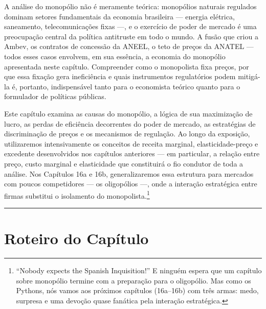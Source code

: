 \documentclass[11pt,twoside,openright]{book}
\begin{document}
A análise do monopólio não é meramente teórica: monopólios naturais
regulados dominam setores fundamentais da economia brasileira ---
energia elétrica, saneamento, telecomunicações fixas ---, e o exercício
de poder de mercado é uma preocupação central da política antitruste em
todo o mundo. A fusão que criou a Ambev, os contratos de concessão da
ANEEL, o teto de preços da ANATEL --- todos esses casos envolvem, em sua
essência, a economia do monopólio apresentada neste capítulo.
Compreender como o monopolista fixa preços, por que essa fixação gera
ineficiência e quais instrumentos regulatórios podem mitigá-la é,
portanto, indispensável tanto para o economista teórico quanto para o
formulador de políticas públicas.

Este capítulo examina as causas do monopólio, a lógica de sua
maximização de lucro, as perdas de eficiência decorrentes do poder de
mercado, as estratégias de discriminação de preços e os mecanismos de
regulação. Ao longo da exposição, utilizaremos intensivamente os
conceitos de receita marginal, elasticidade-preço e excedente
desenvolvidos nos capítulos anteriores --- em particular, a relação
entre preço, custo marginal e elasticidade que constituirá o fio
condutor de toda a análise. Nos Capítulos 16a e 16b, generalizaremos
essa estrutura para mercados com poucos competidores --- os oligopólios
---, onde a interação estratégica entre firmas substitui o isolamento do
monopolista.\footnote{``Nobody expects the Spanish Inquisition!'' E
  ninguém espera que um capítulo sobre monopólio termine com a
  preparação para o oligopólio. Mas como os Pythons, nós vamos aos
  próximos capítulos (16a--16b) com três armas: medo, surpresa e uma
  devoção quase fanática pela interação estratégica.}

\begin{center}\rule{0.5\linewidth}{0.5pt}\end{center}

\section{Roteiro do Capítulo}\label{roteiro-do-capuxedtulo}
\end{document}
